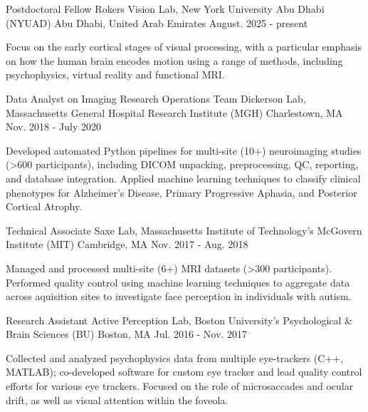 \begin{cventries}
  \cventry
    {Postdoctoral Fellow}
    {Rokers Vision Lab, New York University Abu Dhabi (NYUAD)}
    {Abu Dhabi, United Arab Emirates}
    {August. 2025 - present}
    {
      \begin{cvitems}
        \item {Focus on the early cortical stages of visual processing, with a particular emphasis on how the human brain encodes motion using a range of methods, including psychophysics, virtual reality and functional MRI.}
      \end{cvitems}
    }
  \cventry
    {Data Analyst on Imaging Research Operations Team}
    {Dickerson Lab, Massachusetts General Hospital Research Institute (MGH)}
    {Charlestown, MA}
    {Nov. 2018 - July 2020}
    {
      \begin{cvitems}
        \item {Developed automated Python pipelines for multi-site (10+) neuroimaging studies (>600 participants), including DICOM unpacking, preprocessing, QC, reporting, and database integration. Applied machine learning techniques to classify clinical phenotypes for Alzheimer's Disease, Primary Progressive Aphasia, and Posterior Cortical Atrophy.}
      \end{cvitems}
    }
  \cventry
    {Technical Associate}
    {Saxe Lab, Massachusetts Institute of Technology's McGovern Institute (MIT)}
    {Cambridge, MA}
    {Nov. 2017 - Aug. 2018}
    {
      \begin{cvitems}
        \item {Managed and processed multi-site (6+) MRI datasets (>300 participants). Performed quality control using machine learning techniques to aggregate data across aquisition sites to investigate face perception in individuals with autism.}
      \end{cvitems}
    }
  \cventry
    {Research Assistant}
    {Active Perception Lab, Boston University's Psychological \& Brain Sciences (BU)}
    {Boston, MA}
    {Jul. 2016 - Nov. 2017}
    {
      \begin{cvitems}
	\item {Collected and analyzed psychophysics data from multiple eye-trackers (C++, MATLAB); co-developed software for custom eye tracker and lead quality control efforts for various eye trackers. Focused on the role of microsaccades and ocular drift, as well as visual attention within the foveola.}
      \end{cvitems}
    }
\end{cventries}
